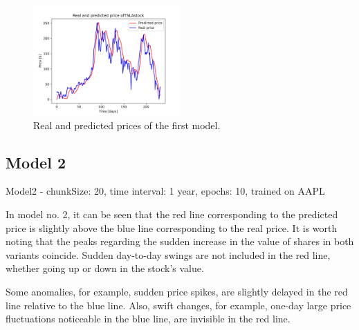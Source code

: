 \begin{figure}
\includegraphics[width=0.5\textwidth]{./graf/model1/TSLA.png}
\caption{Real and predicted prices of the first model.}
\label{fig:label}
\end{figure} 

\clearpage
\subsection{Model 2}

Model2 - chunkSize: 20, time interval: 1 year, epochs: 10, trained on AAPL\par\bigskip
In model no. 2, it can be seen that the red line corresponding to the predicted price is slightly above
the blue line corresponding to the real price. It is worth noting that the peaks regarding the sudden
increase in the value of shares in both variants coincide. Sudden day-to-day swings are not included
in the red line, whether going up or down in the stock's value.
\par
Some anomalies, for example, sudden price spikes, are slightly delayed in the red line relative to the blue line.
Also, swift changes, for example, one-day large price fluctuations noticeable in the blue line, are invisible
in the red line.

